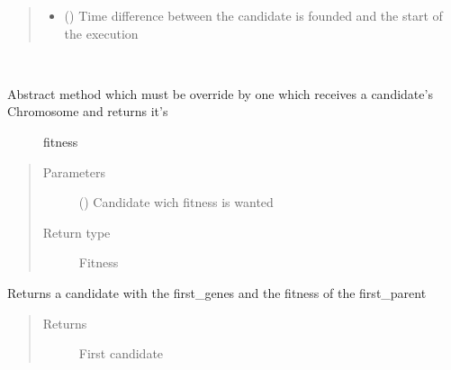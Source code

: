 \documentclass[letterpaper,10pt,english]{sphinxmanual}
\begin{document}
\begin{fulllineitems}
\begin{fulllineitems}
\begin{quote}
\begin{description}
\begin{itemize}
\item {} 
\sphinxAtStartPar
{} () \textendash{} Time difference between the candidate is founded and the start of the execution

\end{itemize}

\end{description}\end{quote}

\end{fulllineitems}


\begin{fulllineitems}
\label{\detokenize{genetic:genetic.Genetic.get_fitness}}~\begin{description}
\item[{Abstract method which must be override by one which receives a candidate’s Chromosome and returns it’s}] \leavevmode
\sphinxAtStartPar
fitness

\end{description}
\begin{quote}\begin{description}
\item[{Parameters}] \leavevmode
\sphinxAtStartPar
{} () \textendash{} Candidate wich fitness is wanted

\item[{Return type}] \leavevmode
\sphinxAtStartPar
Fitness

\end{description}\end{quote}

\end{fulllineitems}


\begin{fulllineitems}
\label{\detokenize{genetic:genetic.Genetic.load}}
\sphinxAtStartPar
Returns a candidate with the first\_genes and the fitness of the first\_parent
\begin{quote}\begin{description}
\item[{Returns}] \leavevmode
\sphinxAtStartPar
First candidate


\end{description}
\end{quote}
\end{fulllineitems}
\end{fulllineitems}
\end{document}
